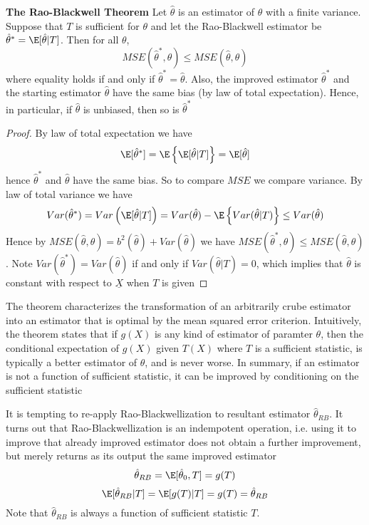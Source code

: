 \documentclass[11pt]{article}
\begin{document}
\begin{theorem*}
  \textbf{The Rao-Blackwell Theorem} Let $\hat{\theta}$ is an estimator of $\theta$ with a finite variance. Suppose that $T$ is sufficient for $\theta$ and let the Rao-Blackwell estimator be $\hat{\theta}^* = \E[\hat{\theta} | T]$. Then for all $\theta$,
  \[
    MSE(\hat{\theta}^*, \theta) \leq MSE(\hat{\theta}, \theta)
  \]
  where equality holds if and only if $\hat{\theta}^* = \hat{\theta}$. Also, the improved estimator $\hat{\theta}^*$ and the starting estimator $\hat{\theta}$ have the same bias (by law of total expectation). Hence, in particular, if $\hat{\theta}$ is unbiased, then so is $\hat{\theta}^*$
  \begin{proof}
    By law of total expectation we have
    \[
      \E[\hat{\theta}^*] = \E\left\{ \E[\hat{\theta}| T]\right\} = \E[\hat{\theta}]
    \]
    hence $\hat{\theta}^*$ and $\hat{\theta}$ have the same bias. So to compare $MSE$ we compare variance. By law of total variance we have
    \[
      Var(\hat{\theta}^*) = Var\left(\E[\hat{\theta}|T]\right) = Var(\hat{\theta}) - \E\left\{ Var(\hat{\theta} | T) \right\} \leq Var(\hat{\theta})
    \]
    Hence by $MSE(\hat{\theta}, \theta) = b^2(\hat{\theta}) + Var(\hat{\theta})$ we have $MSE(\hat{\theta}^*, \theta) \leq MSE(\hat{\theta}, \theta)$. Note $Var(\hat{\theta}^*) =Var(\hat{\theta})$ if and only if $Var(\hat{\theta} | T) = 0$, which implies that $\hat{\theta}$ is constant with respect to $\underline{X}$ when $T$ is given

  \end{proof}
  \begin{note}
      The theorem characterizes the transformation of an arbitrarily crube estimator into an estimator that is optimal by the mean squared error criterion. Intuitively, the theorem states that if $g(X)$ is any kind of estimator of paramter $\theta$, then the conditional expectation of $g(X)$ given $T(X)$ where $T$ is a sufficient statistic, is typically a better estimator of $\theta$, and is never worse. In summary, if an estimator is not a function of sufficient statistic, it can be improved by conditioning on the sufficient statistic \\
  \end{note}
  \begin{rem}
    It is tempting to re-apply Rao-Blackwellization to resultant estimator $\hat{\theta}_{RB}$. It turns out that Rao-Blackwellization is an indempotent operation, i.e. using it to improve that already improved estimator does not obtain a further improvement, but merely returns as its output the same improved estimator
    \[
      \hat{\theta}_{RB} = \E[\hat{\theta}_0, T]=  g(T)
    \]
    \[
      \E[\hat{\theta}_{RB}|T] = \E[g(T)|T] = g(T) = \hat{\theta}_{RB}
    \]
    Note that $\hat{\theta}_{RB}$ is always a function of sufficient statistic $T$.
  \end{rem}
\end{theorem*}
\end{document}
